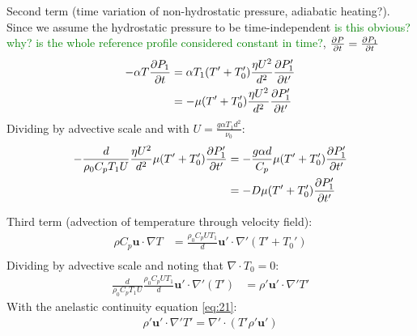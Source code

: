 \documentclass[a4paper]{article}
\begin{document}
\begin{mdframed}
    Second term (time variation of non-hydrostatic pressure, adiabatic heating?). Since we assume the hydrostatic pressure to be time-independent 
    \textcolor{green}{is this obvious? why? is the whole reference profile considered 
    constant in time?}, $\pdv{P}{t} = \pdv{P_1}{t}$ 
    \begin{align*}
        -\alpha T \pdv{P_1}{t} &= \alpha T_1 (T' + T_0') \frac{\eta U^2}{d^2} \pdv{P_1'}{t'} \\
        &= -\mu (T' + T_0') \frac{\eta U^2}{d^2} \pdv{P_1'}{t'}
    \end{align*}
    Dividing by advective scale and with $U = \frac{g\alpha T_1d^2}{\nu_0}$: 
    \begin{align*}
        -\frac{d}{\rho_0C_p T_1 U} \frac{\eta U^2}{d^2}\mu (T' + T_0')  \pdv{P_1'}{t'} &= -\frac{g\alpha d}{C_p} \mu (T' + T_0') \pdv{P_1'}{t'} \\
        &= -D\mu (T' + T_0') \pdv{P_1'}{t'} \\
    \end{align*}
\end{mdframed}
\begin{mdframed}
    Third term (advection of temperature through velocity field): 
    \begin{align*}
        \rho C_p \bm{u}\cdot\nabla T &= \frac{\rho_0C_pUT_1}{d} \bm{u'} \cdot \nabla '(T'+T_0') \\
    \end{align*}
    Dividing by advective scale and noting that $\nabla \cdot T_0 = 0$:   
    \begin{align*}
        \frac{d}{\rho_0C_p T_1 U} \frac{\rho_0C_pUT_1}{d} \bm{u'} \cdot \nabla '(T') & = \rho' \bm{u'} \cdot \nabla 'T'
    \end{align*}
    With the anelastic continuity equation \eqref{eq:21}: 
    \begin{align*}
        \rho' \bm{u'} \cdot \nabla 'T' = \nabla' \cdot (T'\rho'\bm{u'})
    \end{align*}
\end{mdframed}
\end{document}
